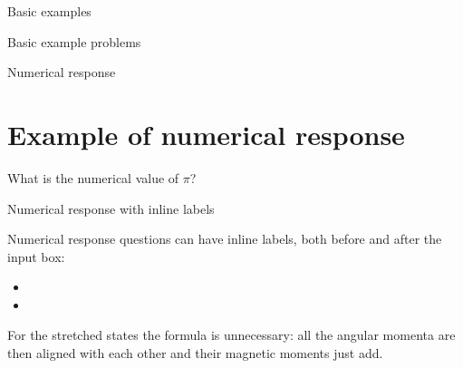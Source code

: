 \begin{edXchapter}{Basic examples}
\begin{edXsection}{Basic example problems}
\begin{edXvertical}

\begin{edXproblem}{Numerical response}

\section{Example of numerical response}  

What is the numerical value of $\pi$?


\end{edXproblem}


\begin{edXproblem}{Numerical response with inline labels}{}

Numerical response questions can have inline labels, both before and after the input box:

\begin{itemize}

\item  

     

\item  

     

\end{itemize}

\begin{edXsolution}

For the stretched states the formula is unnecessary: all the angular momenta are
then aligned with each other and their magnetic moments just add. 

\end{edXsolution}

\end{edXproblem}

\end{edXvertical}


\begin{edXvertical}



\end{edXvertical}
\end{edXsection}
\end{edXchapter}
